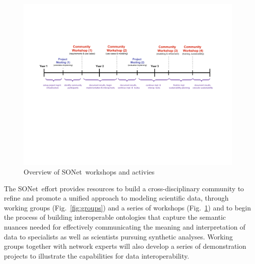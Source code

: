 \documentclass[10pt,twocolumn]{article}
\newcommand{\figref}[1]{Fig.~\ref{#1}}
\newcommand{\mypara}{\vspace{6pt}\noindent}
\newcommand{\sonet}{{SONet}}
\begin{document}
\begin{figure}[!h]
  \begin{footnotesize}
  \centering
  \includegraphics[scale=.35]{sonet-timeline}
  \vspace{-8pt}
  \caption{{\small Overview of \sonet\ workshops and activies}}
  \label{fig:timeline}
  \end{footnotesize}
\end{figure}

\mypara The \sonet\ effort provides resources to build a
cross-disciplinary community to refine and promote a unified approach
to modeling scientific data, through working groups
(\figref{fig:groups}) and a series of workshops
(\figref{fig:timeline}) and to begin the process of building
interoperable ontologies that capture the semantic nuances needed for
effectively communicating the meaning and interpretation of data to
specialists as well as scientists pursuing synthetic analyses.
Working groups together with network experts will also develop a
series of demonstration projects to illustrate the capabilities for
data interoperability.
\end{document}
